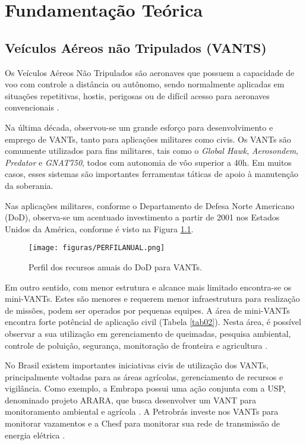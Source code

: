 \chapter[Fundamentação Teórica]{Fundamentação Teórica}

\section{Veículos Aéreos não Tripulados (VANTS)}
Os Veículos Aéreos Não Tripulados são aeronaves que possuem a capacidade de voo com controle a distância ou autônomo, sendo normalmente aplicadas em situações repetitivas, hostis, perigosas ou de difícil acesso para aeronaves convencionais \cite{Furtado}. 

Na última década, observou-se um grande esforço para desenvolvimento e emprego de VANTs, tanto para aplicações militares como civis. Os VANTs são comumente utilizados para fins militares, tais como o \textit{Global Hawk}, \textit{Aerosondem}, \textit{Predator} e \textit{GNAT750}, todos com autonomia de vôo superior a 40h. Em muitos casos, esses sistemas são importantes ferramentas táticas de apoio à manutenção da soberania.

Nas aplicações militares, conforme o Departamento de Defesa Norte Americano (DoD), observa-se um acentuado investimento a partir de 2001 nos Estados Unidos da América, conforme é visto na Figura \ref{PERFILANUAL}.

\begin{figure}
	\centering
	\texttt{[image: figuras/PERFILANUAL.png]}
    \caption{Perfil dos recursos anuais do DoD para VANTs.}
    \label{PERFILANUAL}
\end{figure}

Em outro sentido, com menor estrutura e alcance mais limitado encontra-se os mini-VANTs. Estes são menores e requerem menor infraestrutura para realização de missões, podem ser operados por pequenas equipes. A área de mini-VANTs encontra forte potêncial de aplicação civil (Tabela \ref{tab02}). Nesta área, é possível observar a sua utilização em gerenciamento de queimadas, pesquisa ambiental, controle de poluição, segurança, monitoração de fronteira e agricultura \cite{OliveiraFA}. 

No Brasil existem importantes iniciativas civis de utilização dos VANTs, principalmente voltadas para as áreas agrícolas, gerenciamento de recursos e vigilância. Como exemplo, a Embrapa possui uma ação conjunta com a USP, denominado projeto ARARA, que busca desenvolver um VANT para monitoramento ambiental e agrícola \cite{RASIJR}. A Petrobrás investe nos VANTs para monitorar vazamentos e a Chesf para monitorar sua rede de transmissão de energia elétrica \cite{Furtado}.


